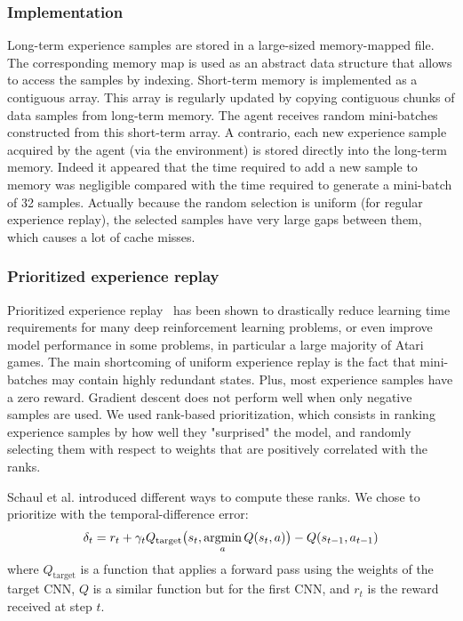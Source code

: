\documentclass[letterpaper]{article}
\newcommand{\argmin}{\operatornamewithlimits{argmin}}
\begin{document}
\subsubsection{Implementation}

Long-term experience samples are stored in a large-sized memory-mapped file. The corresponding memory map is used as an abstract data structure that allows to access
the samples by indexing. Short-term memory is implemented as a contiguous array. This array is regularly updated by copying contiguous chunks of data samples from
long-term memory. The agent receives random mini-batches constructed from this short-term array. A contrario, each new experience sample acquired by the agent
(via the environment) is stored directly into the long-term memory. Indeed it appeared that the time required to add a new sample to memory was negligible
compared with the time required to generate a mini-batch of 32 samples. Actually because the random selection is uniform (for regular experience replay),
the selected samples have very large gaps between them, which causes a lot of cache misses.

\subsubsection{Prioritized experience replay}

Prioritized experience replay~\citep{DBLP:journals/corr/SchaulQAS15} has been shown to drastically reduce learning time requirements for many deep
reinforcement learning problems, or even improve model performance in some problems, in particular a large majority of Atari games.
The main shortcoming of uniform experience replay is the fact that mini-batches may contain highly redundant states. Plus, most experience samples have
a zero reward. Gradient descent does not perform well when only negative samples are used. We used rank-based prioritization, which consists in ranking
experience samples by how well they "surprised" the model, and randomly selecting them with respect to weights that are positively correlated with the ranks.

Schaul et al. introduced different ways to compute these ranks. We chose to prioritize with the temporal-difference error:
\begin{multline}
    \delta_t = r_t + \gamma_t Q_{\text{target}}\big(s_t, \argmin_a Q(s_t, a)\big) - Q(s_{t-1}, a_{t-1})
\end{multline}
where $Q_{\text{target}}$ is a function that applies a forward pass using the weights of the target CNN, $Q$ is a similar function
but for the first CNN, and $r_t$ is the reward received at step $t$.
\end{document}
